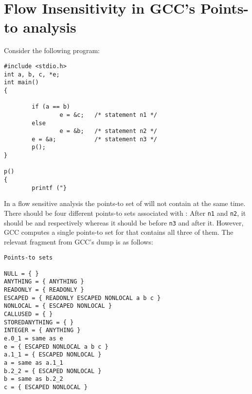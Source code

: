 \documentclass{llncs}
\begin{document}
\section{Flow Insensitivity in GCC's Points-to analysis}
\label{app:pt.counter.examples} 

Consider the following program:
\begin{verbatim}
#include <stdio.h>
int a, b, c, *e;
int main()
{

        if (a == b)
                e = &c;   /* statement n1 */
        else
                e = &b;   /* statement n2 */
        e = &a;           /* statement n3 */
        p();
}

p()
{
        printf ("}
\end{verbatim}

In a flow sensitive analysis the points-to set of  will not contain  at the same time. 
There should be four different points-to sets associated with : After {\tt n1} and {\tt n2},
it should be \text{} and \text{} respectively whereas it should be \text{}
before {\tt n3} and \text{} after it.  However,
GCC computes a single points-to set for  that contains all three of them.
The relevant fragment from GCC's dump is as follows:
\begin{verbatim}
Points-to sets

NULL = { }
ANYTHING = { ANYTHING }
READONLY = { READONLY }
ESCAPED = { READONLY ESCAPED NONLOCAL a b c }
NONLOCAL = { ESCAPED NONLOCAL }
CALLUSED = { }
STOREDANYTHING = { }
INTEGER = { ANYTHING }
e.0_1 = same as e
e = { ESCAPED NONLOCAL a b c }
a.1_1 = { ESCAPED NONLOCAL }
a = same as a.1_1
b.2_2 = { ESCAPED NONLOCAL }
b = same as b.2_2
c = { ESCAPED NONLOCAL }
\end{verbatim}
\end{document}
